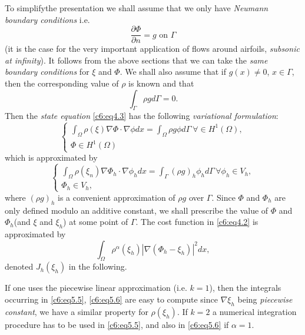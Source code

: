 To simplify\pageoriginale  the presentation we shall assume that we only have 
\textit{Neumann boundary conditions} i.e.  
\begin{equation}
\frac{\partial \Phi}{\partial n} = g \text{ on } \Gamma 
\tag{5.2}\label{c6:eq5.2} 
\end{equation}
(it is the case for the very important application of flows around 
airfoils, \textit{subsonic at infinity}). It follows from the above 
sections that we can take the \textit{same boundary conditions} for 
$\xi$ and $\Phi$. We shall also assume that if $g (x) \neq 0$, $x 
\in \Gamma $, then the corresponding value of $\rho$ is known and 
that      
\begin{equation}
\int_\Gamma \rho g d \Gamma = 0. \tag{5.3}\label{c6:eq5.3} 
\end{equation}
Then the \textit{state equation} \eqref{c6:eq4.3} has the following 
\textit{variational  formulation}: 
\begin{equation}
\begin{cases}
\int_\Omega \rho (\xi ) \nabla \Phi \cdot \nabla \phi dx 
= \int_\Omega \rho g \phi d \Gamma ~ \forall \in H^1 (\Omega ),\\ 
\Phi \in H^1 (\Omega )
\end{cases}
\tag{5.4}\label{c6:eq5.4}
\end{equation}
which is approximated by 
\begin{equation}
\begin{cases}
\int_\Omega \rho (\xi_n ) \nabla \Phi_h \cdot \nabla 
\phi_h dx = \int_\Gamma (\rho g)_h \phi_h d \Gamma\, \forall \phi_h 
\in V_h,\\  
\Phi_h \in V_h,
\end{cases}
\tag{5.5}\label{c6:eq5.5}
\end{equation}
where $(\rho g)_h$ is a convenient approximation of $\rho g$ over 
$\Gamma$. Since $\Phi$ and $\Phi_h$ are only defined modulo an additive 
constant, we shall prescribe the value of $\Phi$ and $\Phi_h$\pageoriginale  (and $\xi$ 
and $\xi_h $) at some point of $\Gamma$. The cost function in 
\eqref{c6:eq4.2} is approximated by     
\begin{equation}
\int_\Omega \rho^\alpha (\xi_h ) | \nabla (\Phi_h - \xi_h ) |^2 
dx, \tag{5.6}\label{c6:eq5.6} 
\end{equation}
denoted $J_h (\xi_h )$ in the following. 

\begin{remark}\label{c6:rem5.5}%
If one uses the piecewise linear approximation (i.e. $k = 1$), then the 
integrals occurring in \eqref{c6:eq5.5}, \eqref{c6:eq5.6} are easy to 
compute since $\nabla \xi_h$ being {\em piecewise constant}, we 
have a similar property for $\rho (\xi_h)$. If $k = 2$ a numerical 
integration procedure has to be used in \eqref{c6:eq5.5}, and also in 
\eqref{c6:eq5.6} if $\alpha = 1$.     
\end{remark}

